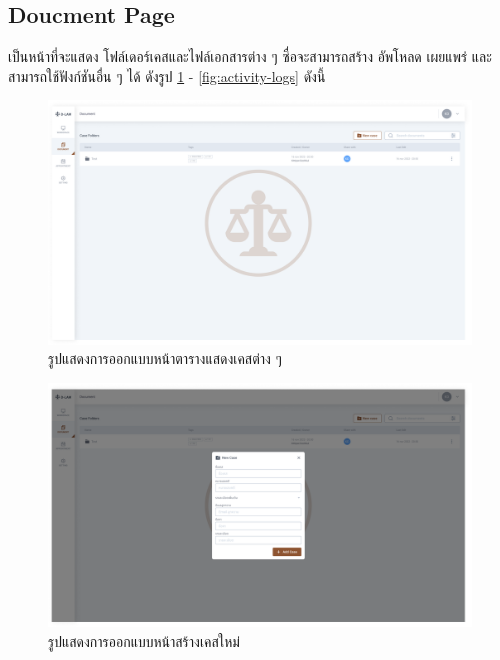 \documentclass[12pt,oneside,openright,a4paper]{cpe-thai-project}
\begin{document}
\subsection{Doucment Page}
\hspace*{1cm} เป็นหน้าที่จะแสดง โฟล์เดอร์เคสและไฟล์เอกสารต่าง ๆ ซื่อจะสามารถสร้าง อัพโหลด เผยแพร่ และสามารถใช้ฟังก์ชันอื่น ๆ ได้ ดังรูป \ref{fig:case-folder} - \ref{fig:activity-logs} ดังนี้
\begin{figure}[!h]\centering
  \includegraphics[width=13cm]{./assets/userinterface/case-folder.png}
  \caption{รูปแสดงการออกแบบหน้าตารางแสดงเคสต่าง ๆ}\label{fig:case-folder}
\end{figure}

\begin{figure}[!h]\centering
  \includegraphics[width=13cm]{./assets/userinterface/new-case.png}
  \caption{รูปแสดงการออกแบบหน้าสร้างเคสใหม่}\label{fig:new-case}
\end{figure}
\end{document}
